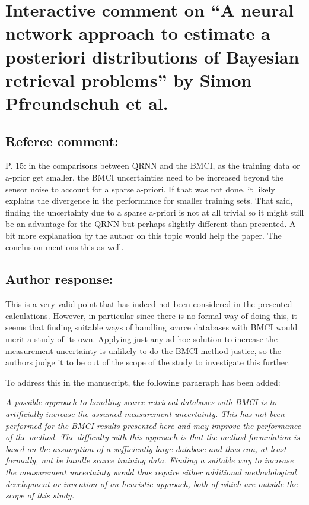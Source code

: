 \documentclass[11pt]{scrartcl}
\author{simon}
\date{\today}
\title{}
\begin{document}
\setlength{\parindent}{0cm}

\section*{Interactive comment on ``A neural network approach to estimate a posteriori distributions of Bayesian retrieval problems'' by Simon Pfreundschuh et al.}

\subsection*{Referee comment:}

P. 15: in the comparisons between QRNN and the BMCI, as the training data or a-prior
get smaller, the BMCI uncertainties need to be increased beyond the sensor noise to
account for a sparse a-priori.  If that was not done, it likely explains the divergence in
the performance for smaller training sets.  That said, finding the uncertainty due to a
sparse a-priori is not at all trivial so it might still be an advantage for the QRNN but
perhaps slightly different than presented. A bit more explanation by the author on this
topic would help the paper. The conclusion mentions this as well.

\subsection*{Author response:}

This is a very valid point that has indeed not been considered in the presented
calculations. However, in particular since there is no formal way of doing this,
it seems that finding suitable ways of handling scarce databases with BMCI would
merit a study of its own. Applying just any ad-hoc solution to increase the
measurement uncertainty is unlikely to do the BMCI method justice, so the authors
judge it to be out of the scope of the study to investigate this further.

To address this in the manuscript, the following paragraph has been added:

\vspace{1em}

\textit{
A possible approach to handling scarce retrieval databases with BMCI is to
artificially increase the assumed measurement uncertainty. This has not been
performed for the BMCI results presented here and may improve the performance of
the method. The difficulty with this approach is that the method formulation
is based on the assumption of a sufficiently large database and thus can,
at least formally, not be handle scarce training data. Finding a suitable way to
increase the measurement uncertainty would thus require either additional
methodological development or invention of an heuristic approach, both of which
are outside the scope of this study.}
\end{document}
